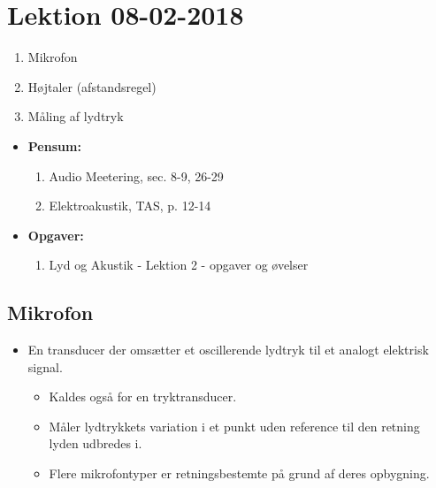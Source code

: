 \section{Lektion 08-02-2018}

\begin{enumerate}
	\item Mikrofon
	\item Højtaler (afstandsregel)
	\item Måling af lydtryk
\end{enumerate}

\begin{mdframed}[style=exampledefault]
	\begin{itemize}
		\item \textbf{Pensum:} 
		\begin{enumerate}
			\item Audio Meetering, sec. 8-9, 26-29
			\item Elektroakustik, TAS,  p. 12-14
		\end{enumerate}
		\item \textbf{Opgaver:} 
		\begin{enumerate}
			\item Lyd og Akustik - Lektion 2 - opgaver og øvelser
		\end{enumerate}
	\end{itemize}
\end{mdframed}

\subsection{Mikrofon}
\begin{itemize}
	\item En transducer der omsætter et oscillerende lydtryk til et analogt elektrisk signal.
	\begin{itemize}
		\item Kaldes også for en tryktransducer.
		\item Måler lydtrykkets variation i et punkt uden reference til den retning lyden udbredes i.
		\item Flere mikrofontyper er retningsbestemte på grund af deres opbygning.
	\end{itemize}
\end{itemize}

